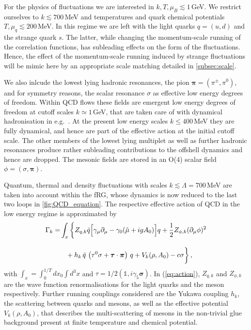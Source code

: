 \documentclass[%
reprint,
superscriptaddress,
showpacs,preprintnumbers,
amsmath,amssymb,
aps,
prd,
]{revtex4-1}
\def\eq#1{(\ref{#1})}
\begin{document}
For the physics of fluctuations we are interested in $k,T, \mu_B\lesssim 1$\,GeV. We restrict ourselves to $k\lesssim 700$\,MeV and temperatures and quark chemical potentials $T,\mu_q \lesssim 200$\,MeV. In this regime we are left with the light quarks $q=(u,d)$ and the strange quark $s$. The latter, while changing the momentum-scale running of the correlation functions, has subleading effects on the form of the fluctuations. Hence, the effect of the momentum-scale running induced by strange fluctuations will be mimic here by an appropriate scale matching detailed in \autoref{subsec:scale}. 

We also inlcude the lowest lying hadronic resonances, the pion ${\bm\pi}=(\pi^\pm,\pi^0)$, and for symmetry reasons, the scalar resonance $\sigma$ as effective low energy degrees of freedom. 
Within QCD flows these fields are emergent low energy degrees of freedom at cutoff scales $k\simeq 1$\,GeV, that are taken care of with dynamical hadronisation in e.g.\ \cite{Fu:2019hdw}. At the present low energy scales $k\leq 400$\,MeV they are fully dynamical, and hence are part of the effective action at the initial cutoff scale. The other members of the lowest lying multiplet as well as further hadronic resonances produce rather subleading contributions to the offshell dynamics and hence are dropped. The mesonic fields are stored in an O(4) scalar field $\phi=(\sigma, {\bm\pi})$. 

Quantum, thermal and density fluctuations with scales $k\lesssim \Lambda= 700$\,MeV are taken into account within the fRG, whose dynamics is now reduced to the last two loops in \autoref{fig:QCD_equation}. The respective effective action of QCD in the low energy regime is approximated by 
%
\begin{align}
\Gamma_k=&\int_x \bigg\{Z_{q,k}\bar{q} \Big [\gamma_\mu \partial_\mu -\gamma_0(\hat\mu+igA_0) \Big ]q+\frac{1}{2}Z_{\phi,k}(\partial_\mu \phi)^2 \nonumber\\[2ex]
&\hspace{.3cm}+h_k\,\bar{q}\,
\left(\tau^0\sigma+\bm\tau
\cdot\bm{\pi}\right)\,q +V_k(\rho,A_0)-c\sigma \bigg\}\,,\label{eq:action}
\end{align}
%
with $\int_{x}=\int_0^{1/T}d x_0 \int d^3 x$ and $\tau=1/2 (\mathbb{1}, i \gamma_5 \bm \sigma)$. In \eq{eq:action}, $Z_{q,k}$ and $Z_{\phi,k}$ are the wave function renormalisations for the light quarks and the meson respectively. Further running couplings considered are the Yukawa coupling $h_k$, the scattering between quarks and mesons, as well as the effective potential $V_k(\rho,A_0)$, that describes the multi-scattering of mesons in the non-trivial glue background present at finite temperature and chemical potential.
	
\end{document}
